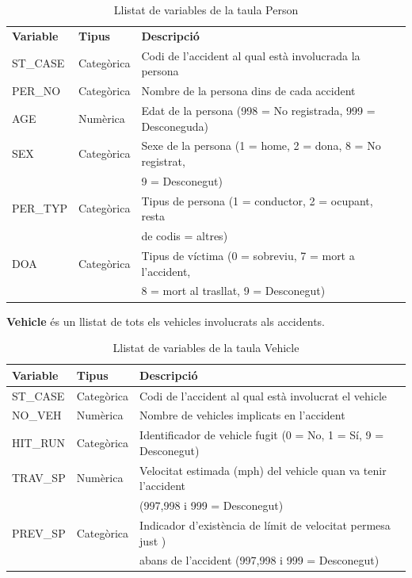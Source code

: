 \documentclass[11pt,longbibliography]{article}
\theoremstyle{definition}
\theoremstyle{remark}
\begin{document}
\begin{table}[H]
\centering
\begin{tabular}{|l|l|l|}
\hline
\textbf{Variable} & \textbf{Tipus} & \textbf{Descripció}                                                       \\
ST\_CASE           & Categòrica     & Codi de l’accident al qual està involucrada la persona                    \\
PER\_NO             & Categòrica     & Nombre de la persona dins de cada accident                                \\
AGE                   & Numèrica       & Edat de la persona (998 = No registrada, 999 = Desconeguda)               \\
SEX                   & Categòrica     & Sexe de la persona (1 = home, 2 = dona, 8 = No registrat,  \\
                          &                        &  9 = Desconegut) \\
PER\_TYP           & Categòrica     & Tipus de persona (1 = conductor, 2 = ocupant, resta    \\
                          &                        &  de codis = altres)    \\
DOA                   & Categòrica      & Tipus de víctima (0 = sobreviu, 7 = mort a l’accident, \\
                          &                         & 8 = mort al trasllat, 9 = Desconegut) \\ \hline
\end{tabular}
\caption{\label{persones-table}Llistat de variables de la taula Person}
\end{table}


\textbf{Vehicle} és un llistat de tots els vehicles involucrats als accidents.


\begin{table}[H]
\centering
\begin{tabular}{|l|l|l|}
\hline
\textbf{Variable} & \textbf{Tipus} & \textbf{Descripció}                                             \\\hline
ST\_CASE           & Categòrica     & Codi de l’accident al qual està involucrat el vehicle           \\
NO\_VEH            & Numèrica       & Nombre de vehicles implicats en l'accident                      \\
HIT\_RUN           & Categòrica     & Identificador de vehicle fugit (0 = No, 1 = Sí, 9 = Desconegut) \\
TRAV\_SP & Numèrica   & Velocitat estimada (mph) del vehicle quan va tenir l’accident                \\
                &                    & (997,998 i 999 = Desconegut)                 \\
PREV\_SP & Categòrica & Indicador d’existència de límit de velocitat permesa just ) \\
                &                    & abans de l’accident (997,998 i 999 = Desconegut) \\ \hline
\end{tabular}
\caption{\label{vehicle-table}Llistat de variables de la taula Vehicle}
\end{table}
\end{document}
